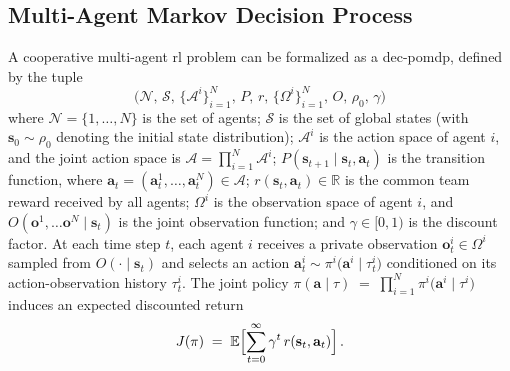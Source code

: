 \subsection{Multi-Agent Markov Decision Process}
A cooperative multi-agent \gls{rl} problem can be formalized as a \gls{dec-pomdp}\cite{oliehoek_concise_2016}, defined by the tuple
\begin{equation}
  \bigl(\mathcal{N},\,\mathcal{S},\,\{\mathcal{A}^i\}_{i=1}^N,\,P,\,r,\,\{\Omega^i\}_{i=1}^N,\,O,\,\rho_0,\,\gamma\bigr)
\end{equation}
where $\mathcal{N}=\{1,\dots,N\}$ is the set of agents; $\mathcal{S}$ is the set of global states (with $\mathbf{s}_0\sim\rho_0$ denoting the initial state distribution); $\mathcal{A}^i$ is the action space of agent $i$, and the joint action space is $\mathcal{A} = \prod_{i=1}^N \mathcal{A}^i$; $P(\mathbf{s}_{t+1} \mid \mathbf{s}_t, \mathbf{a}_t)$ is the transition function, where $\mathbf{a}_t=(\mathbf{a}^1_t,\dots,\mathbf{a}^N_t)\in\mathcal{A}$; $r(\mathbf{s}_t,\mathbf{a}_t)\in\mathbb{R}$ is the common team reward received by all agents; $\Omega^i$ is the observation space of agent $i$, and $O(\mathbf{o}^1,\dots\mathbf{o}^N\mid \mathbf{s}_t)$ is the joint observation function; and $\gamma\in[0,1)$ is the discount factor.
At each time step $t$, each agent $i$ receives a private observation $\mathbf{o}^i_t \in \Omega^i$ sampled from $O(\cdot\mid \mathbf{s}_t)$ and selects an action 
$\mathbf{a}^i_t \sim \pi^i\bigl(\mathbf{a}^i\mid \tau^i_t\bigr)$
conditioned on its action-observation history \(\tau^i_t\). The joint policy 
\(\pi(\mathbf{a}\mid \tau) \;=\; \prod_{i=1}^N \pi^i\bigl(\mathbf{a}^i\mid \tau^i\bigr)\)
induces an expected discounted return
\begin{equation}
  J(\pi) \;=\; \mathbb{E}\Bigl[\sum_{t=0}^\infty \gamma^t\,r(\mathbf{s}_t,\mathbf{a}_t)\Bigr]\,. 
\end{equation}


